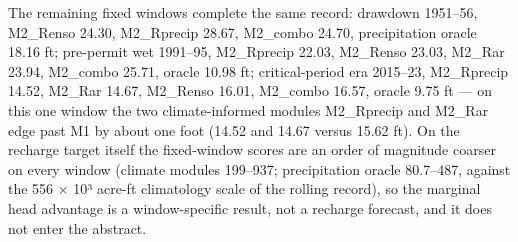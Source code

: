 \documentclass[11pt]{article}
\begin{document}
The remaining fixed windows complete the same record: drawdown 1951--56,
M2\_Renso 24.30, M2\_Rprecip 28.67, M2\_combo 24.70, precipitation
oracle 18.16 ft; pre-permit wet 1991--95, M2\_Rprecip 22.03, M2\_Renso
23.03, M2\_Rar 23.94, M2\_combo 25.71, oracle 10.98 ft; critical-period
era 2015--23, M2\_Rprecip 14.52, M2\_Rar 14.67, M2\_Renso 16.01,
M2\_combo 16.57, oracle 9.75 ft --- on this one window the two
climate-informed modules M2\_Rprecip and M2\_Rar edge past M1 by about
one foot (14.52 and 14.67 versus 15.62 ft). On the recharge target
itself the fixed-window scores are an order of magnitude coarser on
every window (climate modules 199--937; precipitation oracle 80.7--487,
against the 556 × 10³ acre-ft climatology scale of the rolling record),
so the marginal head advantage is a window-specific result, not a
recharge forecast, and it does not enter the abstract.
\end{document}

